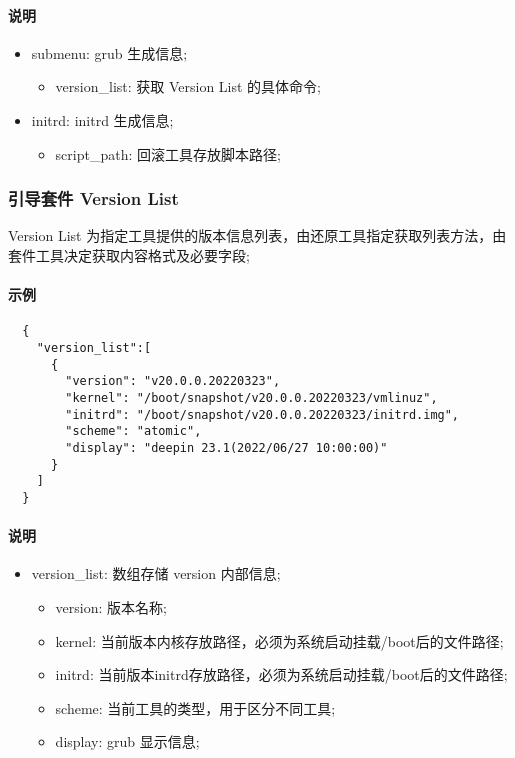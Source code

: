 \documentclass{utart}
\begin{document}
\paragraph{说明}
\begin{itemize}[leftmargin=4em]
  \item submenu: grub 生成信息;
    \begin{itemize}[leftmargin=4em]
    \item version\_list: 获取 Version List 的具体命令;
    \end{itemize}
  \item initrd: initrd 生成信息;
    \begin{itemize}[leftmargin=4em]
    \item script\_path: 回滚工具存放脚本路径;
    \end{itemize}
\end{itemize}

\subsubsection{引导套件 Version List}
Version List 为指定工具提供的版本信息列表，由还原工具指定获取列表方法，由套件工具决定获取内容格式及必要字段;

\paragraph{示例}
\begin{lstlisting}
  {
    "version_list":[
      {
        "version": "v20.0.0.20220323",
        "kernel": "/boot/snapshot/v20.0.0.20220323/vmlinuz",
        "initrd": "/boot/snapshot/v20.0.0.20220323/initrd.img",
        "scheme": "atomic",
        "display": "deepin 23.1(2022/06/27 10:00:00)"
      }
    ]
  }
\end{lstlisting}

\paragraph{说明}
\begin{itemize}[leftmargin=4em]
  \item version\_list: 数组存储 version 内部信息;
    \begin{itemize}[leftmargin=4em]
    \item version: 版本名称;
    \item kernel: 当前版本内核存放路径，必须为系统启动挂载/boot后的文件路径;
    \item initrd: 当前版本initrd存放路径，必须为系统启动挂载/boot后的文件路径;
    \item scheme: 当前工具的类型，用于区分不同工具;
    \item display: grub 显示信息;
    \end{itemize}
\end{itemize}
\end{document}
